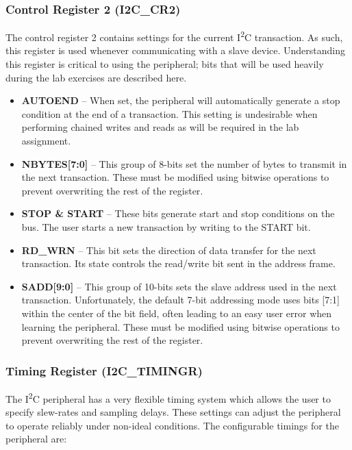\documentclass[openany,11pt,fleqn]{book} %
\begin{document}
    \subsubsection{Control Register 2 (I2C\_CR2)}
    The control register 2 contains settings for the current I\textsuperscript{2}C transaction. As such, this register is used whenever communicating with a slave device. Understanding this register is critical to using the peripheral; bits that will be used heavily during the lab exercises are described here. 
    \begin{itemize}
        \item \textbf{AUTOEND} -- When set, the peripheral will automatically generate a stop condition at the end of a transaction. This setting is undesirable when performing chained writes and reads as will be required in the lab assignment. 
        \item \textbf{NBYTES[7:0]} -- This group of 8-bits set the number of bytes to transmit in the next transaction. These must be modified using bitwise operations to prevent overwriting the rest of the register. 
        \item \textbf{STOP \& START} -- These bits generate start and stop conditions on the bus. The user starts a new transaction by writing to the START bit.
        \item \textbf{RD\_WRN} -- This bit sets the direction of data transfer for the next transaction. Its state controls the read/write bit sent in the address frame. 
        \item \textbf{SADD[9:0]} -- This group of 10-bits sets the slave address used in the next transaction. Unfortunately, the default 7-bit addressing mode uses bits [7:1] within the center of the bit field, often leading to an easy user error when learning the peripheral. These must be modified using bitwise operations to prevent overwriting the rest of the register.  
    \end{itemize}
    
    
    \subsubsection{Timing Register (I2C\_TIMINGR)}
    The I\textsuperscript{2}C peripheral has a very flexible timing system which allows the user to specify slew-rates and sampling delays. These settings can adjust the peripheral to operate reliably under non-ideal conditions. The configurable timings for the peripheral are:
    
\end{document}
